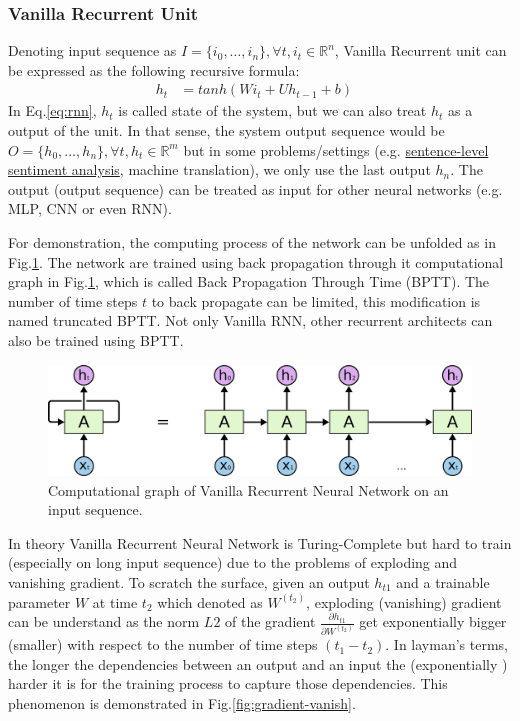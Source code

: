 \subsubsection{Vanilla Recurrent Unit}\label{sec:vanilla-rnn}
Denoting input sequence as \(I = \{i_0,\ldots,i_n\}, \forall t, i_t \in \mathbb{R}^n\), Vanilla Recurrent unit can be expressed as the following recursive formula\cite{treeLSTM}:
\begin{align}
  	h_t &= tanh(Wi_t + Uh_{t-1} + b)&\label{eq:rnn}
\end{align}
In Eq.\ref{eq:rnn}, \(h_t\) is called state of the system\cite{deeplearning-book}, but we can also treat \(h_t\) as a output of the unit.  
In that sense, the system output sequence would be \(O = \{h_0,\ldots,h_n\}, \forall t, h_t \in \mathbb{R}^m\) but in some problems/settings (e.g. \hyperref[sec:sent-level]{sentence-level sentiment analysis}, machine translation\cite{SutskeverVL14}), we only use the last output \(h_n\).
The output (output sequence) can be treated as input for other neural networks (e.g. MLP, CNN or even RNN).
 
For demonstration, the computing process of the network can be unfolded as in Fig.\ref{fig:rnn-unfold}. 
The network are trained using back propagation through it computational graph in Fig.\ref{fig:rnn-unfold}, which is called Back Propagation Through Time (BPTT)\cite{BPTT}. 
The number of time steps \(t\) to back propagate can be limited, this modification is named truncated BPTT\cite{truncatedBPTT}. 
Not only Vanilla RNN, other recurrent architects can also be trained using BPTT.

\begin{figure}[H]
	\centering
	\includegraphics[scale=0.4]{figure/rnn-unroll}
	\caption{Computational graph of Vanilla Recurrent Neural Network on an input sequence\cite{colah-lsmt}.}
	\label{fig:rnn-unfold}
\end{figure}
\label{sec:gradient-vanish}
In theory Vanilla Recurrent Neural Network is Turing-Complete\cite{rnn-turing-complete} but  hard to train (especially on long input sequence) due to the problems of exploding and vanishing gradient\cite{Bengio1994}. 
To scratch the surface, given an output \(h_{t1}\) and a trainable parameter \(W\) at time \(t_2\) which denoted as \(W^{(t_2)}\),  exploding (vanishing) gradient can be understand as the norm \(L2\) of the gradient \(\frac{\partial h_{t1}}{\partial W^{(t_2)}}\) get exponentially bigger (smaller) with respect to the number of time steps \((t_1-t_2)\)\cite{Bengio1994}.
In layman's terms, the longer the dependencies between an output and an input the (exponentially ) harder it is for the training process to capture those dependencies.
This phenomenon is demonstrated in Fig.\ref{fig:gradient-vanish}. 

